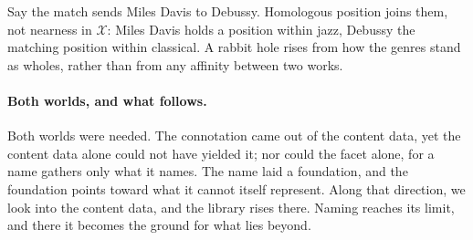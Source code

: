 Say the match sends Miles Davis to Debussy. Homologous position joins them, not
nearness in $\mathcal{X}$: Miles Davis holds a position within jazz, Debussy the
matching position within classical. A rabbit hole rises from how the genres
stand as wholes, rather than from any affinity between two works.

\paragraph{Both worlds, and what follows.}
Both worlds were needed. The connotation came out of the content data, yet the
content data alone could not have yielded it; nor could the facet alone, for a
name gathers only what it names. The name laid a foundation, and the foundation
points toward what it cannot itself represent. Along that direction, we look
into the content data, and the library rises there. Naming reaches its limit,
and there it becomes the ground for what lies beyond.